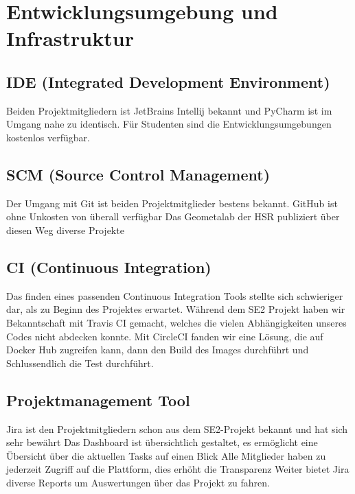 \section{Entwicklungsumgebung und Infrastruktur}
\subsection{IDE (Integrated Development Environment)}
Beiden Projektmitgliedern ist JetBrains Intellij bekannt und \Gls{PyCharm} ist im Umgang nahe zu identisch.
Für Studenten sind die Entwicklungsumgebungen kostenlos verfügbar.
\subsection{SCM (Source Control Management)}
Der Umgang mit \Gls{Git} ist beiden Projektmitglieder bestens bekannt.
\Gls{GitHub} ist ohne Unkosten von überall verfügbar
Das Geometalab der HSR publiziert über diesen Weg diverse Projekte

\subsection{CI (Continuous Integration)}
Das finden eines passenden Continuous Integration Tools stellte sich schwieriger dar, als zu Beginn des Projektes erwartet. Während dem SE2 Projekt haben wir Bekanntschaft mit Travis CI gemacht, welches die vielen Abhängigkeiten unseres Codes nicht abdecken konnte. Mit CircleCI fanden wir eine Lösung, die auf Docker Hub zugreifen kann, dann den Build des Images durchführt und Schlussendlich die Test durchführt.

\subsection{Projektmanagement Tool}
\Gls{Jira} ist den Projektmitgliedern schon aus dem SE2-Projekt bekannt und hat sich sehr bewährt
Das Dashboard ist übersichtlich gestaltet, es ermöglicht eine Übersicht über die aktuellen Tasks auf einen Blick
Alle Mitglieder haben zu jederzeit Zugriff auf die Plattform, dies erhöht die Transparenz
Weiter bietet Jira diverse Reports um Auswertungen über das Projekt zu fahren.

